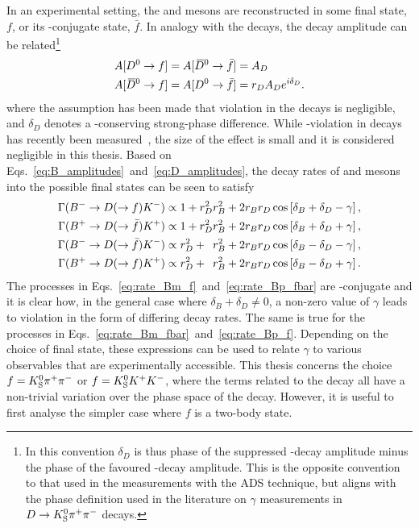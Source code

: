 In an experimental setting, the \Dz and \Dzb mesons are reconstructed in some final state, $f$, or its \CP-conjugate state, $\bar f$. In analogy with the \Bpm decays, the \D decay amplitude can be related\footnote{In this convention $\delta_D$ is thus phase of the suppressed \D-decay amplitude minus the phase of the favoured \D-decay amplitude. This is the opposite convention to that used in the \lhcb measurements with the ADS technique, but aligns with the phase definition used in the literature on $\gamma$ measurements in ${D}\rightarrow{\ensuremath{{K}^0_{\mathrm{S}}}}{\ensuremath{{\pi}^+}}{\ensuremath{{\pi}^-}}$ decays.} 
\begin{align}
\begin{split}\label{eq:D_amplitudes}
    A[{{D}^0}\rightarrow f] &= A[{{\kern 0.18em\overline{\kern -0.18em D}}{}^0}\rightarrow \bar f] = A_D \\ 
    A[{{\kern 0.18em\overline{\kern -0.18em D}}{}^0} \rightarrow f] &= A[{{D}^0} \rightarrow \bar f] = r_D A_D e^{i\delta_D}.
\end{split}
\end{align}
where the assumption has been made that \CP violation in the \D decays is negligible, and $\delta_D$ denotes a \CP-conserving strong-phase difference. While \CP-violation in \D decays has recently been measured~\cite{LHCb-PAPER-2019-006}, the size of the effect is small and it is considered negligible in this thesis. Based on Eqs.~\eqref{eq:B_amplitudes}~and~\eqref{eq:D_amplitudes}, the decay rates of \Bp and \Bm mesons into the possible final states can be seen to satisfy 
\begin{subequations}\label{eq:rate_equations}
\begin{align}
    \Gamma({{{B}^-}} \rightarrow {\ensuremath{D}}(\rightarrow f){{K}^-}) & \propto 
    1 + r_D^2 r_B^2 + 2 r_B r_D \cos\left[\delta_B + \delta_D - \gamma\right], \label{eq:rate_Bm_f}\\
    \Gamma({{{B}^+}} \rightarrow {\ensuremath{D}}(\rightarrow \bar f){{K}^+}) & \propto 
    1 + r_D^2 r_B^2 + 2 r_B r_D \cos\left[\delta_B + \delta_D + \gamma\right], \label{eq:rate_Bp_fbar}\\
    \Gamma({{{B}^-}} \rightarrow {\ensuremath{D}}(\rightarrow \bar f){{K}^-}) & \propto
    r_D^2 + \phantom{1}r_B^2 + 2 r_B r_D \cos\left[\delta_B - \delta_D - \gamma\right], \label{eq:rate_Bm_fbar}\\
    \Gamma({{{B}^+}} \rightarrow {\ensuremath{D}}(\rightarrow f){{K}^+}) & \propto
    r_D^2 + \phantom{1}r_B^2 + 2 r_B r_D \cos\left[\delta_B - \delta_D + \gamma\right]. \label{eq:rate_Bp_f} 
\end{align}
\end{subequations}
The processes in Eqs.~\eqref{eq:rate_Bm_f}~and~\eqref{eq:rate_Bp_fbar} are \CP-conjugate and it is clear how, in the general case where $\delta_B+\delta_D\neq 0$,  a non-zero value of $\gamma$ leads to \CP violation in the form of differing decay rates. The same is true for the processes in Eqs.~\eqref{eq:rate_Bm_fbar}~and~\eqref{eq:rate_Bp_f}. Depending on the choice of \D final state, these expressions can be used to relate $\gamma$ to various observables that are experimentally accessible. This thesis concerns the choice $f={{K}^0_{\mathrm{S}}}{{\pi}^+}{{\pi}^-}$ or $f={{K}^0_{\mathrm{S}}}{{K}^+}{{K}^-}$, where the terms related to the \D decay all have a non-trivial variation over the phase space of the decay. However, it is useful to first analyse the simpler case where $f$ is a two-body state. 

